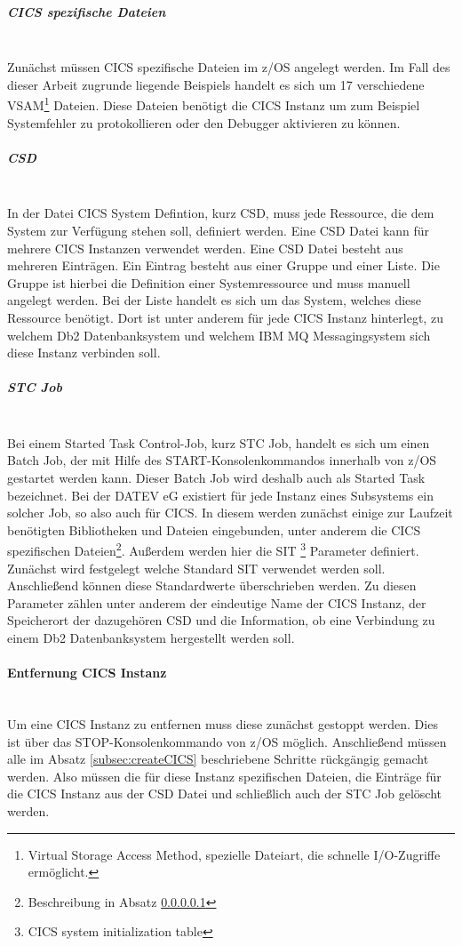 \subparagraph{CICS spezifische Dateien}\label{sssec:speziDat} ~\\
Zunächst müssen CICS spezifische Dateien im z/OS angelegt werden.
Im Fall des dieser Arbeit zugrunde liegende Beispiels handelt es sich um 17 verschiedene VSAM\footnote{Virtual Storage Access Method, spezielle Dateiart, die schnelle I/O-Zugriffe ermöglicht.\cite{Lovelace.2013}} Dateien.
Diese Dateien benötigt die CICS Instanz um zum Beispiel Systemfehler zu protokollieren oder den Debugger aktivieren zu können.

\subparagraph{CSD} ~\\
In der Datei \glqq CICS System Defintion\grqq, kurz CSD, muss jede Ressource, die dem System zur Verfügung stehen soll, definiert werden.
Eine CSD Datei kann für mehrere CICS Instanzen verwendet werden.
Eine CSD Datei besteht aus mehreren Einträgen.
Ein Eintrag besteht aus einer Gruppe und einer Liste.
Die Gruppe ist hierbei die Definition einer Systemressource und muss manuell angelegt werden.
Bei der Liste handelt es sich um das System, welches diese Ressource benötigt.
Dort ist unter anderem für jede CICS Instanz hinterlegt, zu welchem Db2 Datenbanksystem und welchem IBM MQ Messagingsystem sich diese Instanz verbinden soll.

\subparagraph{STC Job} ~\\
Bei einem Started Task Control-Job, kurz STC Job, handelt es sich um einen Batch Job, der mit Hilfe des \glqq START\grqq-Konsolenkommandos innerhalb von z/OS gestartet werden kann.
Dieser Batch Job wird deshalb auch als Started Task bezeichnet.\cite{Cassier.2007}
Bei der DATEV eG existiert für jede Instanz eines Subsystems ein solcher Job, so also auch für CICS.
In diesem werden zunächst einige zur Laufzeit benötigten Bibliotheken und Dateien eingebunden, unter anderem die CICS spezifischen Dateien\footnote{Beschreibung in Absatz \ref{sssec:speziDat}}.
Außerdem werden hier die SIT \footnote{CICS system initialization table} Parameter definiert.
Zunächst wird festgelegt welche Standard SIT verwendet werden soll.
Anschließend können diese Standardwerte überschrieben werden.
Zu diesen Parameter zählen unter anderem der eindeutige Name der CICS Instanz, der Speicherort der dazugehören CSD und die Information, ob eine Verbindung zu einem Db2 Datenbanksystem hergestellt werden soll.

\paragraph{Entfernung CICS Instanz} ~\\
Um eine CICS Instanz zu entfernen muss diese zunächst gestoppt werden.
Dies ist über das \glqq STOP\grqq-Konsolenkommando von z/OS möglich.
Anschließend müssen alle im Absatz \ref{subsec:createCICS} beschriebene Schritte rückgängig gemacht werden.
Also müssen die für diese Instanz spezifischen Dateien, die Einträge für die CICS Instanz aus der CSD Datei und schließlich auch der STC Job gelöscht werden.

